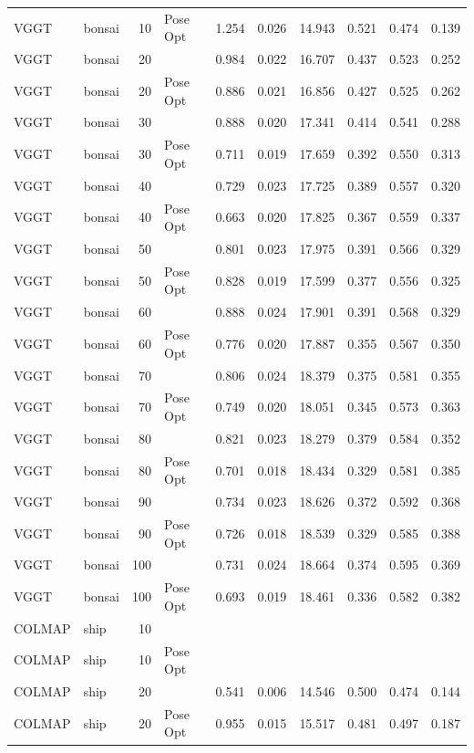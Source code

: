 \begin{table}[H]
\begin{tabular}{llrlrrrrrr}
VGGT & bonsai & 10 & Pose Opt & 1.254 & 0.026 & 14.943 & 0.521 & 0.474 & 0.139 \\
VGGT & bonsai & 20 &  & 0.984 & 0.022 & 16.707 & 0.437 & 0.523 & 0.252 \\
VGGT & bonsai & 20 & Pose Opt & 0.886 & 0.021 & 16.856 & 0.427 & 0.525 & 0.262 \\
VGGT & bonsai & 30 &  & 0.888 & 0.020 & 17.341 & 0.414 & 0.541 & 0.288 \\
VGGT & bonsai & 30 & Pose Opt & 0.711 & 0.019 & 17.659 & 0.392 & 0.550 & 0.313 \\
VGGT & bonsai & 40 &  & 0.729 & 0.023 & 17.725 & 0.389 & 0.557 & 0.320 \\
VGGT & bonsai & 40 & Pose Opt & 0.663 & 0.020 & 17.825 & 0.367 & 0.559 & 0.337 \\
VGGT & bonsai & 50 &  & 0.801 & 0.023 & 17.975 & 0.391 & 0.566 & 0.329 \\
VGGT & bonsai & 50 & Pose Opt & 0.828 & 0.019 & 17.599 & 0.377 & 0.556 & 0.325 \\
VGGT & bonsai & 60 &  & 0.888 & 0.024 & 17.901 & 0.391 & 0.568 & 0.329 \\
VGGT & bonsai & 60 & Pose Opt & 0.776 & 0.020 & 17.887 & 0.355 & 0.567 & 0.350 \\
VGGT & bonsai & 70 &  & 0.806 & 0.024 & 18.379 & 0.375 & 0.581 & 0.355 \\
VGGT & bonsai & 70 & Pose Opt & 0.749 & 0.020 & 18.051 & 0.345 & 0.573 & 0.363 \\
VGGT & bonsai & 80 &  & 0.821 & 0.023 & 18.279 & 0.379 & 0.584 & 0.352 \\
VGGT & bonsai & 80 & Pose Opt & 0.701 & 0.018 & 18.434 & 0.329 & 0.581 & 0.385 \\
VGGT & bonsai & 90 &  & 0.734 & 0.023 & 18.626 & 0.372 & 0.592 & 0.368 \\
VGGT & bonsai & 90 & Pose Opt & 0.726 & 0.018 & 18.539 & 0.329 & 0.585 & 0.388 \\
VGGT & bonsai & 100 &  & 0.731 & 0.024 & 18.664 & 0.374 & 0.595 & 0.369 \\
VGGT & bonsai & 100 & Pose Opt & 0.693 & 0.019 & 18.461 & 0.336 & 0.582 & 0.382 \\
\midrule
COLMAP & ship & 10 &  &  &  &  &  &  &  \\
COLMAP & ship & 10 & Pose Opt &  &  &  &  &  &  \\
COLMAP & ship & 20 &  & 0.541 & 0.006 & 14.546 & 0.500 & 0.474 & 0.144 \\
COLMAP & ship & 20 & Pose Opt & 0.955 & 0.015 & 15.517 & 0.481 & 0.497 & 0.187 \\

\end{tabular}
\end{table}
